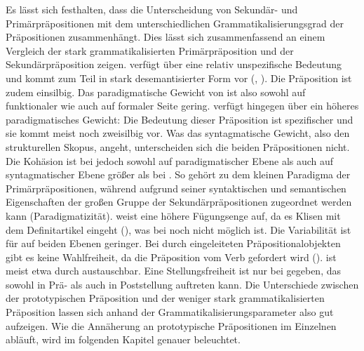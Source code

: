 Es lässt sich festhalten, dass die Unterscheidung von Sekundär- und Primärpräpositionen mit dem unterschiedlichen Grammatikalisierungsgrad der Präpositionen zusammenhängt. 
Dies lässt sich zusammenfassend an einem Vergleich der stark grammatikalisierten Primärpräposition  und der Sekundärpräposition \wegen{} zeigen. 
 verfügt über eine relativ unspezifische Bedeutung und kommt zum Teil in stark desemantisierter Form vor (, ). 
Die Präposition ist zudem einsilbig. 
Das paradigmatische Gewicht von  ist also sowohl auf funktionaler wie auch auf formaler Seite gering. 
 verfügt hingegen über ein höheres paradigmatisches Gewicht: Die Bedeutung dieser Präposition ist spezifischer und sie kommt meist noch zweisilbig vor. 
Was das syntagmatische Gewicht, also den strukturellen Skopus, angeht, unterscheiden sich die beiden Präpositionen nicht. %
Die Kohäsion ist bei  jedoch sowohl auf paradigmatischer Ebene als auch auf syntagmatischer Ebene größer als bei \wegen. 
So gehört  zu dem kleinen Paradigma der Primärpräpositionen, während \wegen{} aufgrund seiner syntaktischen und semantischen Eigenschaften der großen Gruppe der Sekundärpräpositionen zugeordnet werden kann (Paradigmatizität).
 weist eine höhere Fügungsenge auf, da es Klisen mit dem Definitartikel eingeht (), was bei \wegen{} noch nicht möglich ist. 
Die Variabilität ist für  auf beiden Ebenen geringer. 
Bei durch  eingeleiteten Präpositionalobjekten gibt es keine Wahlfreiheit, da die Präposition vom Verb gefordert wird (). 
 ist meist etwa durch  austauschbar. 
Eine Stellungsfreiheit ist nur bei \wegen{} gegeben, das sowohl in Prä- als auch in Poststellung auftreten kann. 
Die Unterschiede zwischen der prototypischen Präposition  und der weniger stark grammatikalisierten Präposition \wegen{} lassen sich anhand der Grammatikalisierungsparameter also gut aufzeigen. 
Wie die Annäherung an prototypische Präpositionen im Einzelnen abläuft, wird im folgenden Kapitel genauer beleuchtet. 
